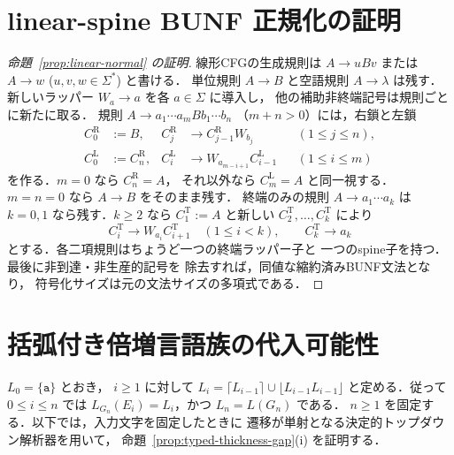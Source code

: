 \documentclass[11pt,a4paper]{ltjsarticle}
\theoremstyle{remark}
\theoremstyle{plain}
\begin{document}
\section{linear-spine BUNF 正規化の証明}
\label{app:linear-normalization}
\begin{proof}[命題~\ref{prop:linear-normal} の証明]
線形CFGの生成規則は $A\to uBv$ または
$A\to w$ ($u,v,w\in\Sigma^*$) と書ける．
単位規則 $A\to B$ と空語規則 $A\to\lambda$ は残す．
新しいラッパー $W_a\to a$ を各 $a\in\Sigma$ に導入し，
他の補助非終端記号は規則ごとに新たに取る．
規則 $A\to a_1\cdots a_m B b_1\cdots b_n$
（$m+n>0$）には，右鎖と左鎖
\[
\begin{aligned}
C^{\mathrm R}_0&:=B,&
C^{\mathrm R}_j&\to C^{\mathrm R}_{j-1}W_{b_j}
  &&(1\le j\le n),\\
C^{\mathrm L}_0&:=C^{\mathrm R}_n,&
C^{\mathrm L}_i&\to W_{a_{m-i+1}}C^{\mathrm L}_{i-1}
  &&(1\le i\le m)
\end{aligned}
\]
を作る．$m=0$ なら $C^{\mathrm R}_n=A$，
それ以外なら $C^{\mathrm L}_m=A$ と同一視する．
$m=n=0$ なら $A\to B$ をそのまま残す．
終端のみの規則 $A\to a_1\cdots a_k$ は
$k=0,1$ なら残す．$k\ge2$ なら
$C^{\mathrm T}_1:=A$ と新しい
$C^{\mathrm T}_2,\ldots,C^{\mathrm T}_k$ により
\[
 C^{\mathrm T}_i\to W_{a_i}C^{\mathrm T}_{i+1}
 \quad(1\le i<k),\qquad C^{\mathrm T}_k\to a_k
\]
とする．各二項規則はちょうど一つの終端ラッパー子と
一つのspine子を持つ．最後に非到達・非生産的記号を
除去すれば，同値な縮約済みBUNF文法となり，
符号化サイズは元の文法サイズの多項式である．
\end{proof}

\section{括弧付き倍増言語族の代入可能性}
\label{app:bracketed-substitutability}

$L_0=\{\mathtt a\}$ とおき，
$i\ge1$ に対して
$L_i=\lceil{}L_{i-1}\rceil\cup\lfloor{}L_{i-1}L_{i-1}\rfloor$
と定める．従って $0\le i\le n$ では
$L_{G_n}(E_i)=L_i$，かつ $L_n=L(G_n)$ である．
$n\ge1$ を固定する．以下では，入力文字を固定したときに
遷移が単射となる決定的トップダウン解析器を用いて，
命題~\ref{prop:typed-thickness-gap}(i) を証明する．
\end{document}
